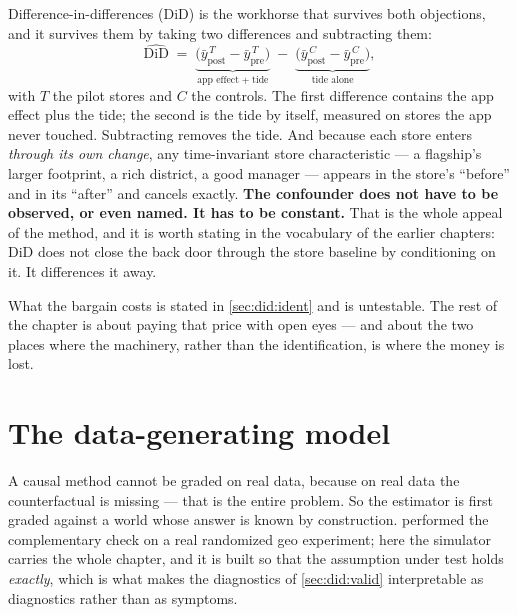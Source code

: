 Difference-in-differences (DiD) is the workhorse that survives both objections, and it survives
them by taking two differences and subtracting them:
%
\begin{equation}
  \widehat{\text{DiD}}
  \;=\;
  \underbrace{\big(\bar y^{\,T}_{\text{post}} - \bar y^{\,T}_{\text{pre}}\big)}_{\text{app effect} \;+\; \text{tide}}
  \;-\;
  \underbrace{\big(\bar y^{\,C}_{\text{post}} - \bar y^{\,C}_{\text{pre}}\big)}_{\text{tide alone}},
  \label{eq:did:twobytwo}
\end{equation}
%
with $T$ the pilot stores and $C$ the controls. The first difference contains the app effect plus
the tide; the second is the tide by itself, measured on stores the app never touched. Subtracting
removes the tide. And because each store enters \emph{through its own change}, any time-invariant
store characteristic --- a flagship's larger footprint, a rich district, a good manager --- appears
in the store's ``before'' and in its ``after'' and cancels exactly. \textbf{The confounder does not
have to be observed, or even named. It has to be constant.} That is the whole appeal of the method,
and it is worth stating in the vocabulary of the earlier chapters: DiD does not close the back door
through the store baseline by conditioning on it. It differences it away.

What the bargain costs is stated in \cref{sec:did:ident} and is untestable. The rest of the chapter
is about paying that price with open eyes --- and about the two places where the machinery, rather
than the identification, is where the money is lost.



\section{The data-generating model}
\label{sec:did:dgm}

A causal method cannot be graded on real data, because on real data the counterfactual is missing
--- that is the entire problem. So the estimator is first graded against a world whose answer is
known by construction. \Refgeo{} performed the complementary check on a real randomized geo
experiment; here the simulator carries the whole chapter, and it is built so that the assumption
under test holds \emph{exactly}, which is what makes the diagnostics of \cref{sec:did:valid}
interpretable as diagnostics rather than as symptoms.


